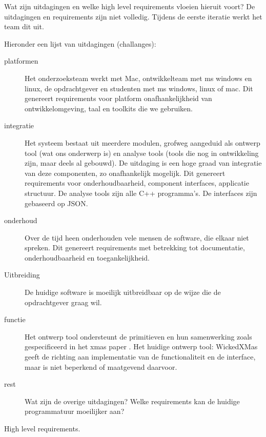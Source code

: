 \documentclass[a4paper,11pt,twoside,draft]{article}
\begin{document}
Wat zijn uitdagingen en welke high level requirements vloeien hieruit voort? De uitdagingen en requirements
zijn niet volledig. Tijdens de eerste iteratie werkt het team dit uit.

Hieronder een lijst van uitdagingen (challanges):

\begin{description}
 \item[platformen] Het onderzoeksteam werkt met Mac, ontwikkelteam met ms windows en linux, de opdrachtgever en studenten met ms windows, linux of mac.
		    Dit genereert requirements voor platform onafhankelijkheid van ontwikkelomgeving, taal en toolkits die we gebruiken.
 \item[integratie] Het systeem bestaat uit meerdere modulen, grofweg aangeduid als ontwerp tool (wat ons onderwerp is) en analyse tools (tools die nog
		    in ontwikkeling zijn, maar deels al gebouwd). De uitdaging is een hoge graad van integratie van deze componenten, zo onafhankelijk mogelijk.
		    Dit genereert requirements voor onderhoudbaarheid, component interfaces, applicatie structuur. De analyse tools zijn alle C++ programma's.
		    De interfaces zijn gebaseerd op JSON.
 \item[onderhoud] Over de tijd heen onderhouden vele mensen de software, die elkaar niet spreken. Dit genereert requirements met betrekking tot documentatie,
		    onderhoudbaarheid en toegankelijkheid.
 \item[Uitbreiding] De huidige software is moeilijk uitbreidbaar op de wijze die de opdrachtgever graag wil.
 \item[functie] Het ontwerp tool ondersteunt de primitieven en hun samenwerking zoals gespecificeerd in het xmas paper \cite{chatterjee-kishinevsky:xmas}.
		Het  huidige ontwerp tool: WickedXMas geeft de richting aan implementatie van de functionaliteit en de interface, maar is
		niet beperkend of maatgevend daarvoor.
 \item[rest]	Wat zijn de overige uitdagingen? Welke requirements kan de huidige programmatuur moeilijker aan?
\end{description}

High level requirements.
\end{document}
